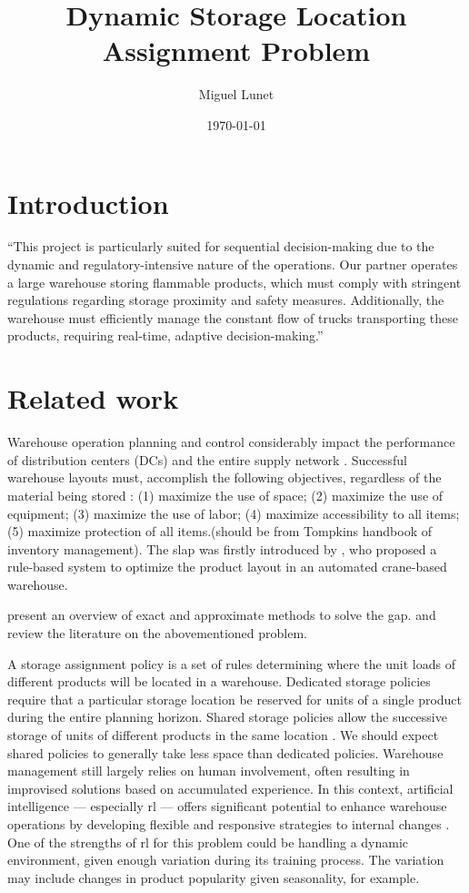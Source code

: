 \documentclass[a4paper,twoside,11pt]{article}
\title{Dynamic Storage Location Assignment Problem}
\author{Miguel Lunet}
\date{\today}
\begin{document}
\maketitle


\section{Introduction}



``This project is particularly suited for sequential decision-making due to the dynamic and regulatory-intensive nature of the operations. Our partner operates a large warehouse storing flammable products, which must comply with stringent regulations regarding storage proximity and safety measures. Additionally, the warehouse must efficiently manage the constant flow of trucks transporting these products, requiring real-time, adaptive decision-making.''

\section{Related work}

Warehouse operation planning and control considerably impact the performance of distribution centers (DCs) and the entire supply network \citep{renaud2008improving}.  Successful warehouse layouts must, accomplish the following objectives, regardless of the material being stored \citep{larson1997heuristic}: (1) maximize the use of space; (2) maximize the use of equipment; (3) maximize the use of labor; (4) maximize accessibility to all items; (5) maximize protection of all items.(should be from Tompkins handbook of inventory management). The \gls{slap} was firstly introduced by \cite{hausman1976optimal}, who proposed a rule-based system to optimize the product layout in an automated crane-based warehouse.

\cite{martello1992generalized} present an overview of exact and approximate methods to solve the \gls{gap}. \cite{gu2007research} and \cite{reyes2019storage} review the literature on the abovementioned problem.

A storage assignment policy is a set of rules determining where the unit loads of different products will be located in a warehouse. Dedicated storage policies require that a particular storage location be reserved for units of a single product during the entire planning horizon. Shared storage policies allow the successive storage of units of different products in the same location \citep{goetschalckx1990shared}. We should expect shared policies to generally take less space than dedicated policies. Warehouse management still largely relies on human involvement, often resulting in improvised solutions based on accumulated experience. In this context, artificial intelligence — especially \gls{rl} — offers significant potential to enhance warehouse operations by developing flexible and responsive strategies to internal changes \citep{cestero2022storehouse}. One of the strengths of \gls{rl} for this problem could be handling a dynamic environment, given enough variation during its training process. The variation may include changes in product popularity given seasonality, for example.
\end{document}
